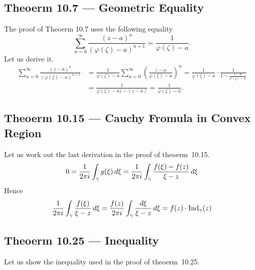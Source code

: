 \subsection{Theoerm 10.7 --- Geometric Equality}

The proof of Theoerm 10.7 uses the following equality
\begin{equation*}
\sum_{n=0}^\infty \frac{(z - a)^n}{\left(\varphi(\zeta) - a\right)^{n+1}}
  = \frac{1}{\varphi(\zeta) - a}.
\end{equation*}
Let us derive it.
\begin{align*}
\sum_{n=0}^\infty \frac{(z - a)^n}{\left(\varphi(\zeta) - a\right)^{n+1}}
 &= \frac{1}{\varphi(\zeta) - a}
  \sum_{n=0}^\infty \left(\frac{z - a}{\varphi(\zeta) - a}\right)^n
  = \frac{1}{\varphi(\zeta) - a}
    \cdot
    \frac{1}{1 - \frac{z - a}{\varphi(\zeta) - a}} \\
 &= \frac{1}{\varphi(\zeta) - a) - (z - a)}
  = \frac{1}{\varphi(\zeta) - a}.
\end{align*}

\subsection{Theoerm 10.15 --- Cauchy Fromula in Convex Region}

Let us work out the last derivation in the proof of theoerm~10.15.
\begin{equation*}
0 = \frac{1}{2\pi i}\int_\gamma g(\xi)\,d\xi
= \frac{1}{2\pi i}\int_\gamma \frac{f(\xi)-f(z)}{\xi - z}\,d\xi
\end{equation*}
Hence
\begin{equation*}
\frac{1}{2\pi i}\int_\gamma \frac{f(\xi)}{\xi - z}\,d\xi
= \frac{f(z)}{2\pi i}\int_\gamma \frac{d\xi}{\xi - z}\,d\xi
= f(z)\cdot\mathop{\rm Ind}\nolimits_\gamma(z)
\end{equation*}


\subsection{Theoerm 10.25 --- Inequality}

Let us show the inequality used in the proof of theoerm~10.25.


